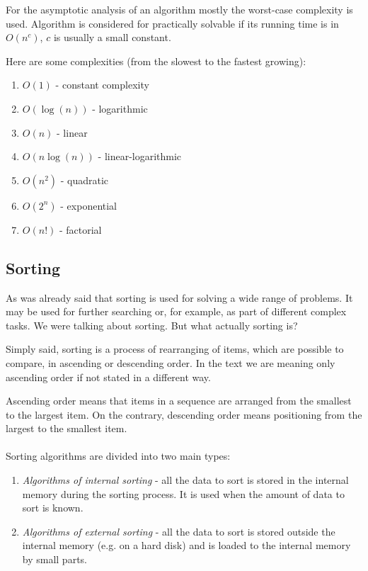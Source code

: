 \documentclass[
  field=inf,
  biblatex,
  language=english,
  glossaries,
  theorems=false,
  sourcecodes=false,
  index
]{kidiplom}
\begin{document}
For the asymptotic analysis of an algorithm mostly the worst-case complexity is used. Algorithm is considered for practically solvable if its running time is in $O(n^c)$, $c$ is usually a small constant. 

Here are some complexities (from the slowest to the fastest growing):
\begin{enumerate}
 \item $O(1)$ - constant complexity
 \item $O(\log(n))$ - logarithmic
 \item $O(n)$ - linear
 \item $O(n \log(n))$ - linear-logarithmic
 \item $O(n^2)$ - quadratic
 \item $O(2^n)$ - exponential
 \item $O(n!)$ - factorial
\end{enumerate}

\subsection{Sorting}

As was already said that sorting is used for solving a wide range of problems. It may be used for further searching or, for example, as part of different complex tasks. We were talking about sorting. But what actually sorting is?

Simply said, sorting is a process of rearranging of items, which are possible to compare, in ascending or descending order. In the text we are meaning only ascending order if not stated in a different way.

Ascending order means that items in a sequence are arranged from the smallest to the largest item. On the contrary, descending order means positioning from the largest to the smallest item.
\\\\
Sorting algorithms are divided into two main types:
\begin{enumerate}
	\item \textit{Algorithms of internal sorting} - all the data to sort is stored in the internal memory during the sorting process. It is used when the amount of data to sort is known.
	\item \textit{Algorithms of external sorting} - all the data to sort is stored outside the internal memory (e.g. on a hard disk) and is loaded to the internal memory by small parts.
\end{enumerate}
\end{document}
